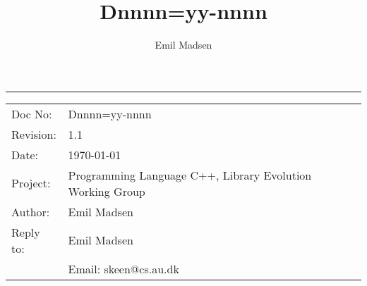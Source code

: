 \documentclass[english, 12pt, a4paper]{article}
\begin{document}
\title{Dnnnn=yy-nnnn\vspace{-1ex}}
\author{Emil Madsen}
\date{\vspace{-5ex}}

\maketitle
\hrule

\begin{center}
\begin{tabular}{ll}
  Doc No:   & Dnnnn=yy-nnnn   \\
  Revision: & 1.1             \\
  Date:     & \today          \\
  Project:  & Programming Language C++, Library Evolution Working Group \\
  Author:   & Emil Madsen     \\
  Reply to: & Emil Madsen     \\
            & Email: skeen@cs.au.dk
\end{tabular}
\end{center}

 

\end{document}
